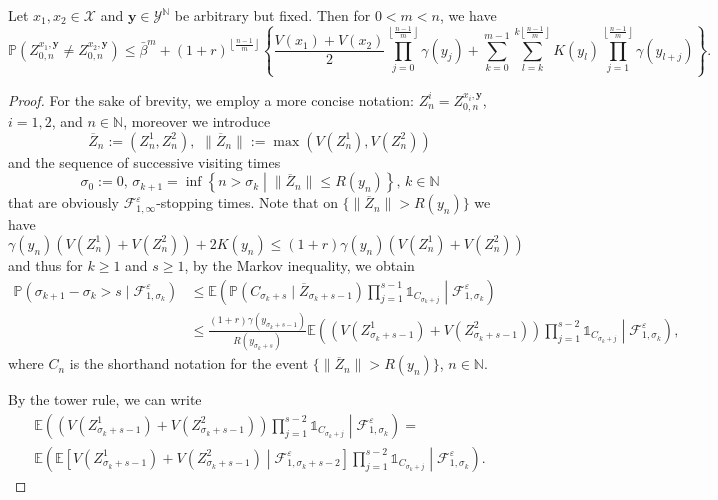 \documentclass[10pt,a4paper]{amsart}
\newcommand{\E}{\mathbb{E}}
\newcommand{\F}{\mathcal{F}}
\newcommand{\N}{\mathbb{N}}
\newcommand{\X}{\mathcal{X}}
\newcommand{\Y}{\mathcal{Y}}
\newcommand{\eps}{\varepsilon}
\newcommand{\ga}{\gamma}
\newcommand{\ind}{\mathds{1}}
\newcommand{\lfrf}[1]{\left\lfloor #1\right\rfloor}
\renewcommand{\P}{\mathbb{P}}
\begin{document}
\begin{lemma}\label{lem:coupling}
	Let $x_1,x_2\in\X$ and $\mathbf{y}\in\Y^\N$ be arbitrary but fixed. Then for $0<m<n$, we have
	$$
	\P (Z_{0,n}^{x_1,\mathbf{y}} \ne Z_{0,n}^{x_2,\mathbf{y}})
	\le
	\bar{\beta}^m
	+
	(1+r)^{\lfrf{\frac{n-1}{m}}}\left\{
	\frac{V(x_1)+V(x_2)}{2}\prod_{j=0}^{\lfrf{\frac{n-1}{m}}}\ga (y_j)
	+
	\sum_{k=0}^{m-1}\sum_{l=k}^{k\lfrf{\frac{n-1}{m}}} K(y_l)\prod_{j=1}^{\lfrf{\frac{n-1}{m}}}\ga (y_{l+j})
	\right\}.
	$$
\end{lemma}

\begin{proof}
	For the sake of brevity, we employ a more concise notation: $Z_n^i=Z_{0,n}^{x_i,\mathbf{y}}$, $i=1,2$, and $n\in\N$, moreover we introduce
	$$
	\overline{Z}_{n}:=\left(Z_n^1,Z_n^2\right), \,\,
	\lVert \overline{Z}_{n}\rVert:=\max \left( V(Z_n^1), V(Z_n^2) \right)
	$$ 
	and the sequence of successive visiting times
	$$
	\sigma_0:=0,\,\sigma_{k+1} = \inf\left\{n>\sigma_k\middle|  \lVert \overline{Z}_n\rVert\le 
	R(y_n)
	\right\},\,k\in\N
	$$
	that are obviously $\F_{1,\infty}^\eps$-stopping times. Note that on 
	$\{ \lVert \overline{Z}_n\rVert>R (y_n)\}$ we have 
	\begin{equation}\label{eq:contr}
	\ga (y_n) (V( Z_n^1)+V( Z_n^2))+2K(y_n)
	\le
	(1+r)\ga (y_n) (V( Z_n^1)+V( Z_n^2))
	\end{equation}
	and thus for $k\ge 1$ and $s\ge 1$, by the Markov inequality, we obtain
	\begin{align*}
	\P (\sigma_{k+1}-\sigma_{k}>s\mid \F_{1,\sigma_k}^\eps)
	&\le 
	\E \left(
	\P (C_{\sigma_k+s}\mid \overline{Z}_{\sigma_{k}+s-1})
	\prod_{j=1}^{s-1}
	\ind_{C_{\sigma_k+j}}
	\middle| \F_{1,\sigma_k}^\eps\right)\\
	&\le 
	\frac{(1+r)\ga (y_{\sigma_k+s-1})}{R(y_{\sigma_k+s})}
	\E \left(
	\left(V( Z_{\sigma_k+s-1}^1)+V( Z_{\sigma_k+s-1}^2)\right)
	\prod_{j=1}^{s-2}
	\ind_{C_{\sigma_k+j}}
	\middle| \F_{1,\sigma_k}^\eps\right),
	\end{align*}
	where $C_n$ is the shorthand notation for the event $\{\lVert \overline{Z}_n\rVert> 
	R(y_n)\}$, $n\in\N$. 
	
	By the tower rule, we can write
	\begin{multline*}
		\E \left(
		\left(V( Z_{\sigma_k+s-1}^1)+V( Z_{\sigma_k+s-1}^2)\right)
		\prod_{j=1}^{s-2}
		\ind_{C_{\sigma_k+j}}
		\middle| \F_{1,\sigma_k}^\eps\right)
		=\\
		\E \left(
		\E\left[V( Z_{\sigma_k+s-1}^1)+V( Z_{\sigma_k+s-1}^2)\middle|\F_{1,\sigma_{k}+s-2}^\eps\right]
		\prod_{j=1}^{s-2}
		\ind_{C_{\sigma_k+j}}
		\middle| \F_{1,\sigma_k}^\eps\right).
	\end{multline*}
	

\end{proof}
\end{document}
